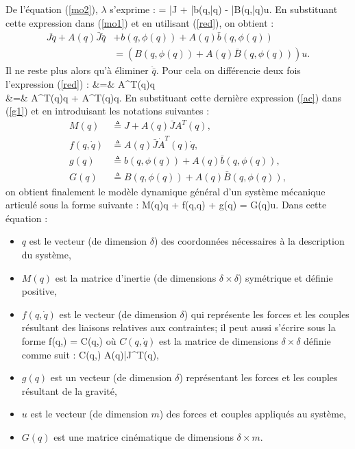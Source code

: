 De l'équation (\ref{mo2}), $\lambda$ s'exprime :
\eqnn
\lambda = \bar{J} + \bar{b}(q,\bar{q}) - \bar{B}(q,\bar{q})u.
\eeqnn
En substituant cette expression dans (\ref{mo1}) et en utilisant (\ref{red}), on obtient :
\begin{equation} \begin{split}
J\ddot{q} + A(q)\bar{J}\ddot{\bar{q}} &+ b(q,\phi(q)) + A(q)\bar{b}(q,\phi(q)) \\
&= (B(q,\phi(q)) + A(q)\bar{B}(q,\phi(q)))u \label{g1}.
\end{split} \end{equation}
Il ne reste plus alors qu'à éliminer $\ddot {\bar q}$. Pour cela on différencie deux
fois l'expression (\ref{red}) :
\eqn
{} &=& A^{T}(q)\dot q \\
  &=& A^{T}(q)\ddot q + \dot A^T(q)\dot q. \label{ac}
\eeqn
En substituant cette dernière expression (\ref{ac}) dans (\ref{g1}) et en introduisant les
notations suivantes :
\begin{equation*} \begin{split}
M(q) &\triangleq J + A(q)\bar{J}A^{T}(q), \\
f(q,\dot{q}) &\triangleq A(q)\bar{J}\dot{A}^{T}(q)\dot{q}, \\
g(q) &\triangleq b(q,\phi(q)) + A(q)\bar{b}(q,\phi(q)), \\
G(q) &\triangleq B(q,\phi(q)) + A(q)\bar{B}(q,\phi(q)),
\end{split} \end{equation*}
on obtient finalement le modèle dynamique général d'un système mécanique articulé 
sous la forme suivante :
\eqn
M(q)\ddot q + f(q,\dot q) + g(q) = G(q)u. \label{modmecgen}
\eeqn
\noindent Dans cette équation :
\begin{itemize}
\item $q$ est le vecteur (de dimension $\delta$) des coordonnées nécessaires 
à la description du système,
\item $M(q)$ est la matrice d'inertie (de dimensions $\delta \times \delta$) symétrique et
définie positive,
\item $f(q,\dot{q})$ est le vecteur (de dimension $\delta$) qui représente les forces et
les couples résultant des liaisons relatives aux contraintes; il peut aussi s'écrire 
sous la forme 
\eqnn
f(q,) = C(q,)
\eeqnn
où $C(q,\dot{q})$ est la matrice de dimensions $\delta \times \delta$ définie
comme suit :
\eqnn
C(q,) \triangleq A(q)\bar{J}^{T}(q),
\eeqnn
\item $g(q)$ est un vecteur (de dimension $\delta$) représentant les forces et les
couples résultant de la gravité,
\item $u$ est le vecteur (de dimension $m$) des forces et couples appliqués au système,
\item $G(q)$ est une matrice cinématique de dimensions $\delta \times m$.
\end{itemize}

